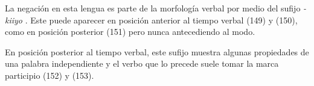 La negación en esta lengua es parte de la morfología verbal por medio del sufijo {\setmainfont{Charis SIL} \textit{-kiiyo}} \textcolor{MidnightBlue}{\citep{choctaw}}. Este puede aparecer en posición anterior al tiempo verbal (149) y (150), como en posición posterior (151) pero nunca antecediendo al modo.

En posición posterior al tiempo verbal, este sufijo muestra algunas propiedades de una palabra independiente y el verbo que lo precede suele tomar la marca participio (152) y (153).